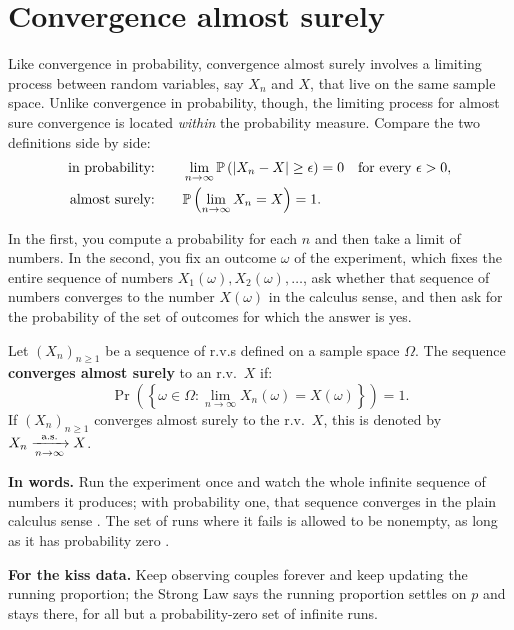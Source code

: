 \section{Convergence almost surely}
\label{sec:conv-as}

Like convergence in probability, convergence almost surely involves a limiting process between random variables, say $X_n$ and $X$, that live on the same sample space.
Unlike convergence in probability, though, the limiting process for almost sure convergence is located \textit{within} the probability measure.
Compare the two definitions side by side:
\begin{align*}
\text{in probability:} \qquad & \lim_{n \to \infty} \mathbb{P} \left( \lvert X_n - X\rvert \geq \epsilon \right) = 0 \quad \text{for every } \epsilon > 0, \\
\text{almost surely:} \qquad & \mathbb{P} \left( \lim_{n \to \infty} X_n = X \right) = 1.
\end{align*}

In the first, you compute a probability for each $n$ and then take a limit of numbers.
In the second, you fix an outcome $\omega$ of the experiment, which fixes the entire sequence of numbers $X_1(\omega), X_2(\omega), \ldots$, ask whether that sequence of numbers converges to the number $X(\omega)$ in the calculus sense, and then ask for the probability of the set of outcomes for which the answer is yes.

\begin{definition}
\label{def:convas}
Let $(X_n)_{n \geq 1}$ be a sequence of r.v.s defined on a sample space $\Omega$.
The sequence \textbf{converges almost surely} to an r.v.\ $X$ if:
\[
\Pr \left( \left\{ \omega \in \Omega : \lim_{n \to \infty} X_n(\omega) = X(\omega) \right\} \right) = 1.
\]
If $(X_n)_{n \geq 1}$ converges almost surely to the r.v.\ $X$, this is denoted by $X_n \xrightarrow [n \to \infty ]{\text{a.s.}} X$.
\end{definition}

\begin{inwords}
\textbf{In words.} Run the experiment once and watch the whole infinite sequence of numbers it produces; with probability one, that sequence converges in the plain calculus sense . The set of runs where it fails is allowed to be nonempty, as long as it has probability zero .
\par\smallskip
\textbf{For the kiss data.} Keep observing couples forever and keep updating the running proportion; the Strong Law says the running proportion settles on $p$ and stays there, for all but a probability-zero set of infinite runs.
\end{inwords}

